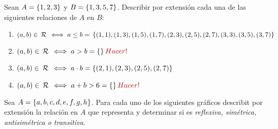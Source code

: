 \documentclass[12pt,a4paper, spanish]{article}
\begin{document}
\ejercicio Sean $A = \left\{ 1, 2, 3 \right\}$ y $B = \left\{ 1, 3, 5, 7 \right\}$. Describir por extensión cada una de las
siguientes relaciones de $A$ en $B$:
\begin{enumerate}[label=\roman*)]
	\item $(a,b) \in \,\mathcal{R}\, \iff a\leq b =\\
		      \left\{ (1,1), (1,3), (1,5), (1,7), (2,3), (2,5), (2,7), (3,3), (3,5), (3,7) \right\}$

	\item $(a,b) \en \relacion \sisolosi a > b = \set{}\hacer$

	\item $(a,b) \in \,\mathcal{R}\, \iff a \cdot b = \left\{ (2,1), (2,3), (2,5), (2,7) \right\}$

	\item $(a,b) \en \relacion \sisolosi a + b > 6 = \set{}\hacer$
\end{enumerate}
\ejercicio Sea $A = \left\{ a,b,c,d,e,f,g,h \right\}$. Para cada uno de los siguientes gráficos describit por
extensión la relación en $A$ que representa y determinar si es \textit{reflexiva, simétrica, antisimétrica o transitiva}.
\end{document}
